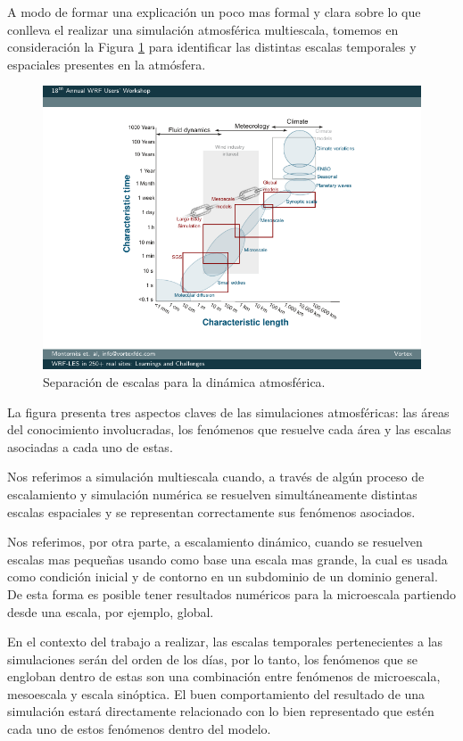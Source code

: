 A modo de formar una explicación un poco mas formal y clara sobre lo que conlleva el realizar una simulación atmosférica multiescala, tomemos en consideración la Figura \ref{fig:02_escalas} para identificar las distintas escalas temporales y espaciales presentes en la atmósfera.

\begin{figure}[h!]
	\centering
	\includegraphics[width=0.8\linewidth,trim={2.6cm 1.4cm 1.5cm 0.8cm},clip]{Imagenes/02/escalas}
	\caption{Separación de escalas para la dinámica atmosférica.}
	\label{fig:02_escalas}
\end{figure}

La figura presenta tres aspectos claves de las simulaciones atmosféricas: las áreas del conocimiento involucradas, los fenómenos que resuelve cada área y las escalas asociadas a cada uno de estas.

Nos referimos a simulación multiescala cuando, a través de algún proceso de escalamiento y simulación numérica se resuelven simultáneamente distintas escalas espaciales y se representan correctamente sus fenómenos asociados.
 
Nos referimos, por otra parte, a escalamiento dinámico, cuando se resuelven escalas mas pequeñas usando como base una escala mas grande, la cual es usada como condición inicial y de contorno en un subdominio de un dominio general. De esta forma es posible tener resultados numéricos para la microescala partiendo desde una escala, por ejemplo, global. 

En el contexto del trabajo a realizar, las escalas temporales pertenecientes a las simulaciones serán del orden de los días, por lo tanto, los fenómenos que se engloban dentro de estas son una combinación entre fenómenos de microescala, mesoescala y escala sinóptica. El buen comportamiento del resultado de una simulación estará directamente relacionado con lo bien representado que estén cada uno de estos fenómenos dentro del modelo.

